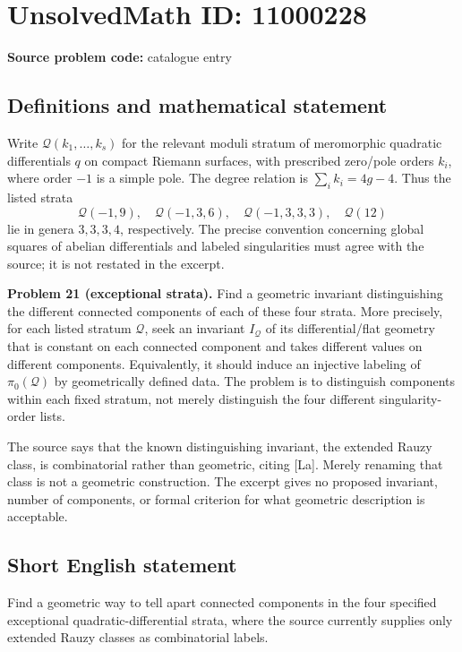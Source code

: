 \documentclass[11pt]{article}
\begin{document}
\section*{UnsolvedMath ID: 11000228}
\textbf{Source problem code:} catalogue entry
\subsection{Definitions and mathematical statement}
Write $\mathcal Q(k_1,\ldots,k_s)$ for the relevant moduli stratum of meromorphic quadratic differentials $q$ on compact Riemann surfaces, with prescribed zero/pole orders $k_i$, where order $-1$ is a simple pole. The degree relation is $\sum_i k_i=4g-4$. Thus the listed strata
\[
 \mathcal Q(-1,9),\quad\mathcal Q(-1,3,6),\quad
 \mathcal Q(-1,3,3,3),\quad\mathcal Q(12)
\]
lie in genera $3,3,3,4$, respectively. The precise convention concerning global squares of abelian differentials and labeled singularities must agree with the source; it is not restated in the excerpt.

\textbf{Problem 21 (exceptional strata).} Find a geometric invariant distinguishing the different connected components of each of these four strata. More precisely, for each listed stratum $\mathcal Q$, seek an invariant $I_{\mathcal Q}$ of its differential/flat geometry that is constant on each connected component and takes different values on different components. Equivalently, it should induce an injective labeling of $\pi_0(\mathcal Q)$ by geometrically defined data. The problem is to distinguish components within each fixed stratum, not merely distinguish the four different singularity-order lists.

The source says that the known distinguishing invariant, the extended Rauzy class, is combinatorial rather than geometric, citing [La]. Merely renaming that class is not a geometric construction. The excerpt gives no proposed invariant, number of components, or formal criterion for what geometric description is acceptable.
\subsection{Short English statement}
Find a geometric way to tell apart connected components in the four specified exceptional quadratic-differential strata, where the source currently supplies only extended Rauzy classes as combinatorial labels.
\end{document}

